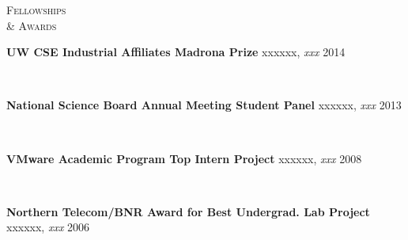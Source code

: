 \documentclass[10pt,times]{report}
\newlength{\sectiongap}
\newlength{\entrygap}
\newlength{\sectioncolwidth}
\newlength{\colgap}
\newlength{\stuffwidth}
\def\ifEqString#1#2{\def\testa{#1}\def\testb{#2}%
  \ifx\testa\testb}
\newenvironment{rtable}{
  \begin{minipage}{\textwidth}
  }{
  \end{minipage}
}
\newenvironment{rentry}[3][xxx]{
  \begin{minipage}[t]{\hsize}
    \textbf{#2}\ifEqString{#1}{xxx}\relax\else, \textit{#1}\fi
    \hspace{\stretch{1}} #3 \\
  }{
    \removelastskip
  \end{minipage}
  \\[\entrygap]  %
}
\newenvironment{rsection}[1]{
  \begin{minipage}[t]{\sectioncolwidth}
    \textsc{#1}
  \end{minipage}
  \hspace{\colgap}
  \begin{minipage}[t]{\stuffwidth}
  }{
    \removelastskip
  \end{minipage}
  \\[\sectiongap]
}
\begin{document}
\begin{rtable}
\begin{rsection}{Fellowships\\\& Awards}
    \begin{rentry}{UW CSE Industrial Affiliates Madrona Prize}{2014}
       \vspace{-0.75em}
    \end{rentry}
    \begin{rentry}{National Science Board Annual Meeting Student
        Panel}{2013}
      \vspace{-0.75em}
    \end{rentry}
    \begin{rentry}{VMware Academic Program Top Intern Project}{2008}
       \vspace{-0.75em}
    \end{rentry}
    \begin{rentry}{Northern Telecom/BNR Award for Best Undergrad. Lab
        Project}{2006}
      \vspace{-0.75em}
    \end{rentry}
  \end{rsection}


\end{rtable}
\end{document}
